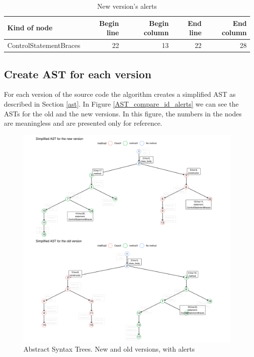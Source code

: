 \documentclass[
]{article}
\begin{document}
\normalsize

\small

\begin{table}[H]

\caption{\label{tab:unnamed-chunk-4}New version's alerts\label{new_alerts}}
\centering
\begin{tabular}[t]{l|r|r|r|r}
\hline
Kind of node & Begin line & Begin column & End line & End column\\
\hline
\rowcolor{gray!6}  ControlStatementBraces & 22 & 13 & 22 & 28\\
\hline
\end{tabular}
\end{table}

\normalsize

\subsection{Create AST for each version}

For each version of the source code the algorithm creates a simplified
AST as described in Section \ref{ast}. In Figure
\ref{AST_compare_id_alerts} we can see the ASTs for the old and the new
versions. In this figure, the numbers in the nodes are meaningless and
are presented only for reference.

\small

\begin{figure}[H]
\includegraphics[width=1\linewidth]{report_files/figure-latex/unnamed-chunk-5-1} \caption{Abstract Syntax Trees. New and old versions, with alerts \label{AST_compare_id_alerts}}\label{fig:unnamed-chunk-5}
\end{figure}
\end{document}
